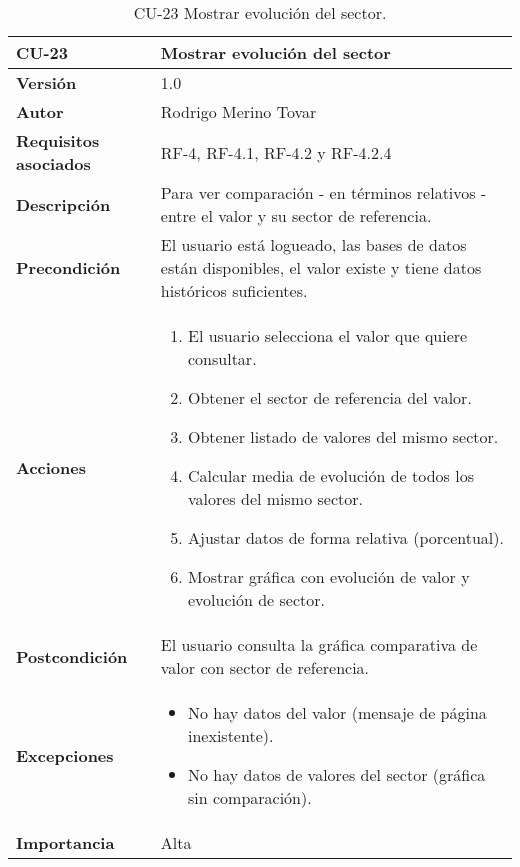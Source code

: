 \begin{table}[p]
	\centering
	\begin{tabularx}{\linewidth}{ p{} p{} }
		\toprule
		\textbf{CU-23}    & \textbf{Mostrar evolución del sector}\\
		\toprule
		\textbf{Versión}              & 1.0    \\
		\textbf{Autor}                & Rodrigo Merino Tovar \\
		\textbf{Requisitos asociados} & RF-4, RF-4.1, RF-4.2 y RF-4.2.4 \\
		\textbf{Descripción}          & Para ver comparación - en términos relativos - entre el valor y su sector de referencia.\\
		\textbf{Precondición}         & El usuario está logueado, las bases de datos están disponibles, el valor existe y tiene datos históricos suficientes.  \\
		\textbf{Acciones}             &
		\begin{enumerate}
			\def\labelenumi{\arabic{enumi}.}
			\tightlist 
			\item El usuario selecciona el valor que quiere consultar. 
			\item Obtener el sector de referencia del valor.
			\item Obtener listado de valores del mismo sector.
			\item Calcular media de evolución de todos los valores del mismo sector. 
			\item Ajustar datos de forma relativa (porcentual).
			\item Mostrar gráfica con evolución de valor y evolución de sector.
		\end{enumerate}\\
		\textbf{Postcondición}        & El usuario consulta la gráfica comparativa de valor con sector de referencia. \\
		\textbf{Excepciones}          & 
		\begin{itemize}
			\tightlist
			\item No hay datos del valor (mensaje de página inexistente).
			\item No hay datos de valores del sector (gráfica sin comparación).
		\end{itemize} \\
		\textbf{Importancia}          & Alta \\
		\bottomrule
	\end{tabularx}
	\caption{CU-23 Mostrar evolución del sector.}
\end{table}


